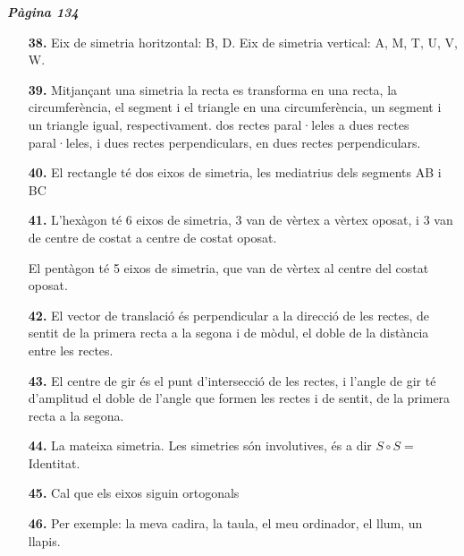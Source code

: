 \documentclass[a4paper, pdf, twoside]{book}
\begin{document}
\begin{multicols}{2}

{\textbf{\em Pàgina 134}} \hrulefill
\begin{enumerate}
\vspace{0.25cm}
\item[\fontfamily{phv}\selectfont\color{blue}\textbf{38. }] 
Eix de simetria horitzontal: B, D. Eix de simetria vertical: A, M, T, U, V, W.
 \end{enumerate}
\begin{enumerate}
\vspace{0.25cm}
\item[\fontfamily{phv}\selectfont\color{blue}\textbf{39. }] 
Mitjançant una simetria la recta es transforma en una recta, la circumferència, el segment i el triangle en una circumferència, un segment i un triangle igual, respectivament. dos rectes paral·leles a dues rectes paral·leles, i dues rectes perpendiculars, en dues rectes perpendiculars.
\vspace{0.25cm}
\item[\fontfamily{phv}\selectfont\color{blue}\textbf{40. }] 
 El rectangle té dos eixos de simetria, les mediatrius dels segments AB i BC
\vspace{0.25cm}
\item[\fontfamily{phv}\selectfont\color{blue}\textbf{41. }] 
 L'hexàgon té 6 eixos de simetria, 3 van de vèrtex a vèrtex oposat, i 3 van de centre de costat a centre de costat oposat.\par El pentàgon té 5 eixos de simetria, que van de vèrtex al centre del costat oposat.
\vspace{0.25cm}
\item[\fontfamily{phv}\selectfont\color{blue}\textbf{42. }] 
El vector de translació és perpendicular a la direcció de les rectes, de sentit de la primera recta a la segona i de mòdul, el doble de la distància entre les rectes.
\vspace{0.25cm}
\item[\fontfamily{phv}\selectfont\color{blue}\textbf{43. }] 
El centre de gir és el punt d'intersecció de les rectes, i l'angle de gir té d'amplitud el doble de l'angle que formen les rectes i de sentit, de la primera recta a la segona.
\vspace{0.25cm}
\item[\fontfamily{phv}\selectfont\color{blue}\textbf{44. }] 
La mateixa simetria. Les simetries són involutives, és a dir $S \circ S=$Identitat.
\vspace{0.25cm}
\item[\fontfamily{phv}\selectfont\color{blue}\textbf{45. }] 
Cal que els eixos siguin ortogonals
\vspace{0.25cm}
\item[\fontfamily{phv}\selectfont\color{blue}\textbf{46. }] 
 Per exemple: la meva cadira, la taula, el meu ordinador, el llum, un llapis.
\vspace{0.25cm}



\end{enumerate}
\end{multicols}
\end{document}
